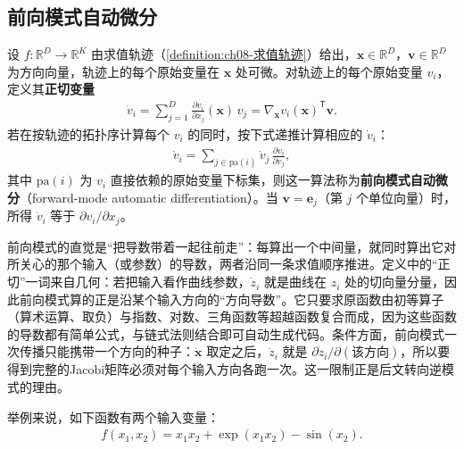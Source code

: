 \documentclass[../../main.tex]{subfiles}
\begin{document}
\subsection{前向模式自动微分}\label{subsection:ch08-前向模式}

\begin{definition}[前向模式自动微分]\label{definition:ch08-前向模式}
设 $f:\mathbb{R}^{D}\to\mathbb{R}^{K}$ 由求值轨迹（\cref{definition:ch08-求值轨迹}）给出，$\mathbf{x}\in\mathbb{R}^{D}$，$\mathbf{v}\in\mathbb{R}^{D}$ 为方向向量，轨迹上的每个原始变量在 $\mathbf{x}$ 处可微。对轨迹上的每个原始变量 $v_i$，定义其\textbf{正切变量}
\begin{align*}
\dot{v}_i=\sum_{j=1}^{D}\frac{\partial v_i}{\partial x_j}(\mathbf{x})\,v_j=\nabla_{\mathbf{x}}v_i(\mathbf{x})^{\mathsf T}\mathbf{v}.
\end{align*}
若在按轨迹的拓扑序计算每个 $v_i$ 的同时，按下式递推计算相应的 $\dot{v}_i$：
\begin{align*}
\dot{v}_i=\sum_{j\in\mathrm{pa}(i)}\dot{v}_j\,\frac{\partial v_i}{\partial v_j},
\end{align*}
其中 $\mathrm{pa}(i)$ 为 $v_i$ 直接依赖的原始变量下标集，则这一算法称为\textbf{前向模式自动微分}（forward-mode automatic differentiation）。当 $\mathbf{v}=\mathbf{e}_j$（第 $j$ 个单位向量）时，所得 $\dot{v}_i$ 等于 $\partial v_i/\partial x_j$。
\end{definition}

\begin{remark}
前向模式的直觉是“把导数带着一起往前走”：每算出一个中间量，就同时算出它对所关心的那个输入（或参数）的导数，两者沿同一条求值顺序推进。定义中的“正切”一词来自几何：若把输入看作曲线参数，$\dot{z}_i$ 就是曲线在 $z_i$ 处的切向量分量，因此前向模式算的正是沿某个输入方向的“方向导数”。它只要求原函数由初等算子（算术运算、取负）与指数、对数、三角函数等超越函数复合而成，因为这些函数的导数都有简单公式，与链式法则结合即可自动生成代码。条件方面，前向模式一次传播只能携带一个方向的种子：$\dot{\mathbf{x}}$ 取定之后，$\dot{z}_i$ 就是 $\partial z_i/\partial(\text{该方向})$，所以要得到完整的Jacobi矩阵必须对每个输入方向各跑一次。这一限制正是后文转向逆模式的理由。
\end{remark}

举例来说，如下函数有两个输入变量：
\begin{align}
f(x_1,x_2)=x_1x_2+\exp(x_1x_2)-\sin(x_2).
\label{align:ch08-示例函数}
\end{align}
\end{document}
